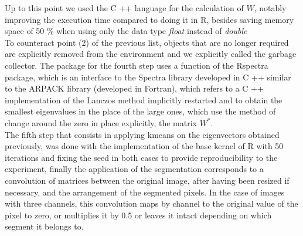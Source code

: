 \documentclass[conference]{IEEEtran}
\begin{document}
Up to this point we used the C ++ language for the calculation of $ W $, notably improving the execution time compared to doing it in R, besides saving memory space of 50 \% when using only the data type \textit {float } instead of \textit {double} \\
To counteract point (2) of the previous list, objects that are no longer required are explicitly removed from the environment and we explicitly called the garbage collector. The package for the fourth step uses a function of the Rspectra \cite{RSpectra} package, which is an interface to the Spectra library developed in C ++ similar to the ARPACK library (developed in Fortran), which refers to a C ++ implementation of the Lanczos method implicitly restarted and to obtain the smallest eigenvalues in the place of the large ones, which use the method of change around the zero in place explicitly, the matrix $ W ^ * $. \\
The fifth step that consists in applying kmeans on the eigenvectors obtained previously, was done with the implementation of the base kernel of R with 50 iterations and fixing the seed in both cases to provide reproducibility to the experiment, finally the application of the segmentation corresponds to a convolution of matrices between the original image, after having been resized if necessary, and the arrangement of the segmented pixels. In the case of images with three channels, this convolution maps by channel to the original value of the pixel to zero, or multiplies it by 0.5 or leaves it intact depending on which segment it belongs to.
\end{document}
